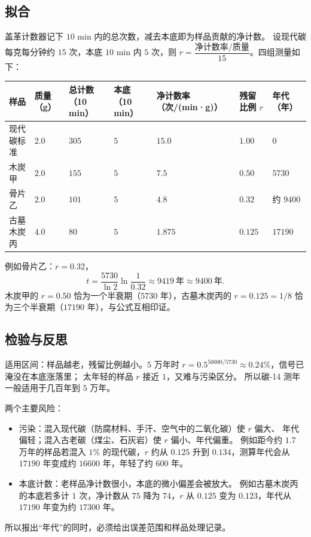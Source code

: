 \subsection{拟合}
盖革计数器记下 $10$ min 内的总次数，减去本底即为样品贡献的净计数。
设现代碳每克每分钟约 $15$ 次，本底 $10$ min 内 $5$ 次，则
$r=\dfrac{\text{净计数率}/\text{质量}}{15}$。四组测量如下：

\begin{center}
\footnotesize
\setlength{\tabcolsep}{4pt}
\renewcommand{\arraystretch}{1.4}
\begin{tabular}{p{2.2cm}p{1.5cm}p{2.0cm}p{1.8cm}p{2.4cm}p{1.8cm}p{2.2cm}}
\toprule
样品 & 质量（g） & 总计数（10 min） & 本底（10 min） & 净计数率（次/(min·g)） & 残留比例 $r$ & 年代（年） \\
\midrule
现代碳标准 & $2.0$ & $305$ & $5$ & $15.0$ & $1.00$ & $0$ \\
木炭甲 & $2.0$ & $155$ & $5$ & $7.5$ & $0.50$ & $5730$ \\
骨片乙 & $2.0$ & $101$ & $5$ & $4.8$ & $0.32$ & 约 $9400$ \\
古墓木炭丙 & $4.0$ & $80$ & $5$ & $1.875$ & $0.125$ & $17190$ \\
\bottomrule
\end{tabular}
\end{center}

例如骨片乙：$r=0.32$，
\[
  t=\frac{5730}{\ln2}\ln\frac{1}{0.32}\approx9419\ \text{年}\approx9400\ \text{年}.
\]
木炭甲的 $r=0.50$ 恰为一个半衰期（$5730$ 年），古墓木炭丙的
$r=0.125=1/8$ 恰为三个半衰期（$17190$ 年），与公式互相印证。

\subsection{检验与反思}
适用区间：样品越老，残留比例越小。$5$ 万年时
$r=0.5^{50000/5730}\approx0.24\%$，信号已淹没在本底涨落里；
太年轻的样品 $r$ 接近 $1$，又难与污染区分。
所以碳-14 测年一般适用于几百年到 $5$ 万年。

两个主要风险：
\begin{itemize}
  \item 污染：混入现代碳（防腐材料、手汗、空气中的二氧化碳）使 $r$ 偏大、
  年代偏轻；混入古老碳（煤尘、石灰岩）使 $r$ 偏小、年代偏重。
  例如距今约 $1.7$ 万年的样品若混入 $1\%$ 的现代碳，$r$ 约从 $0.125$
  升到 $0.134$，测算年代会从 $17190$ 年变成约 $16600$ 年，年轻了约 $600$ 年。
  \item 本底计数：老样品净计数很小，本底的微小偏差会被放大。
  例如古墓木炭丙的本底若多计 $1$ 次，净计数从 $75$ 降为 $74$，$r$ 从
  $0.125$ 变为 $0.123$，年代从 $17190$ 年变为约 $17300$ 年。
\end{itemize}
所以报出“年代”的同时，必须给出误差范围和样品处理记录。

